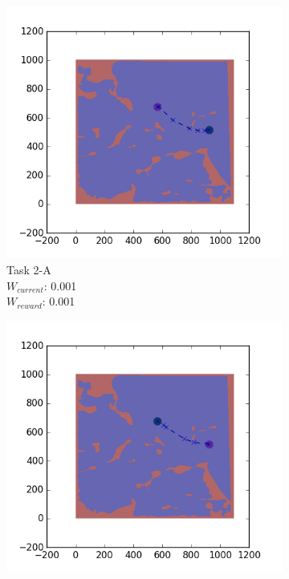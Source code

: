 \documentclass{tamuccthesis}
\begin{document}
\begin{figure}
\begin{subfigure}[b]{0.24\textwidth}
        \includegraphics[width=\textwidth,trim={4cm 3cm 2cm 3cm},clip]{EXP3RG_PathBa_-1_-1_0d001_-1.png}
        \caption[interval 3]%
        {{\small Task 2-A \\ $W_{current}$: 0.001 \\ $W_{reward}$: 0.001}}   
        \label{fig:Path_2-A_upCurrent_Reward}
    \end{subfigure}
  \begin{subfigure}[b]{0.24\textwidth}
        \centering
        \includegraphics[width=\textwidth,trim={4cm 3cm 2cm 3cm},clip]{EXP3RG_PathBb_-1_-1_0d001_0.png}

\end{subfigure}
\end{figure}
\end{document}
